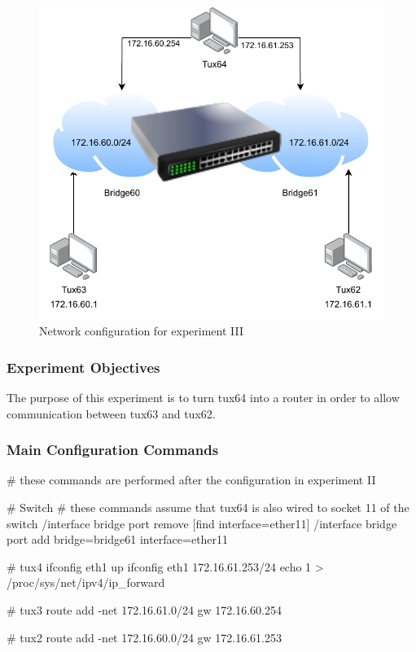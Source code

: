 \documentclass[11pt,a4paper,twocolumn]{article}
\begin{document}
\begin{figure}[H]
    \centering
    \includegraphics[scale=0.5]{experiment3}
    \caption{Network configuration for experiment III}
\end{figure}

\subsubsection{Experiment Objectives}

The purpose of this experiment is to turn tux64 into a router in order to allow communication between tux63 and tux62.

\subsubsection{Main Configuration Commands}

\begin{code-bash}
# these commands are performed after the configuration in experiment II

# Switch
# these commands assume that tux64 is also wired to socket 11 of the switch
/interface bridge port remove [find interface=ether11]
/interface bridge port add bridge=bridge61 interface=ether11

# tux4
ifconfig eth1 up
ifconfig eth1 172.16.61.253/24
echo 1 > /proc/sys/net/ipv4/ip_forward

# tux3
route add -net 172.16.61.0/24 gw 172.16.60.254

# tux2
route add -net 172.16.60.0/24 gw 172.16.61.253
\end{code-bash}
\end{document}

